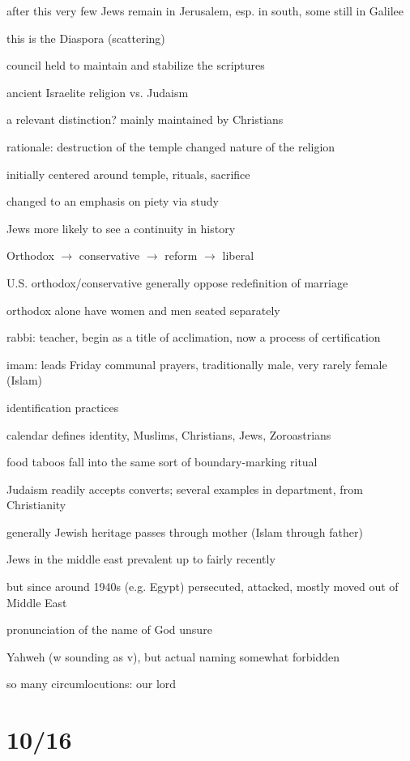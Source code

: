 \documentclass[12pt]{article}
\begin{document}
after this very few Jews remain in Jerusalem, esp. in south, some still in Galilee

this is the Diaspora (scattering)

council held to maintain and stabilize the scriptures

\noindent
ancient Israelite religion vs. Judaism

a relevant distinction? mainly maintained by Christians

rationale: destruction of the temple changed nature of the religion

initially centered around temple, rituals, sacrifice

changed to an emphasis on piety via study

Jews more likely to see a continuity in history

\noindent
Orthodox $\to$ conservative $\to$ reform $\to$ liberal

U.S. orthodox/conservative generally oppose redefinition of marriage

orthodox alone have women and men seated separately

rabbi: teacher, begin as a title of acclimation, now a process of certification

imam: leads Friday communal prayers, traditionally male, very rarely female (Islam)

\noindent
identification practices

calendar defines identity, Muslims, Christians, Jews, Zoroastrians

food taboos fall into the same sort of boundary-marking ritual

Judaism readily accepts converts; several examples in department, from Christianity

generally Jewish heritage passes through mother (Islam through father)

\noindent
Jews in the middle east prevalent up to fairly recently

but since around 1940s (e.g. Egypt) persecuted, attacked, mostly moved out of Middle East

\noindent
pronunciation of the name of God unsure

Yahweh (w sounding as v), but actual naming somewhat forbidden

so many circumlocutions: our lord

\section{10/16}
\end{document}
